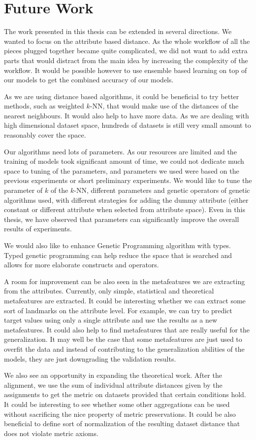 \section{Future Work}
The work presented in this thesis can be extended in several directions. We wanted to focus on the attribute based distance. As the whole workflow of all the pieces plugged together became quite complicated, we did not want to add extra parts that would distract from the main idea by increasing the complexity of the workflow. It would be possible however to use ensemble based learning on top of our models to get the combined accuracy of our models. 

As we are using distance based algorithms, it could be beneficial to try better methods, such as weighted $k$-NN, that would make use of the distances of the nearest neighbours. It would also help to have more data. As we are dealing with high dimensional dataset space, hundreds of datasets is still very small amount to reasonably cover the space. 

Our algorithms need lots of parameters. As our resources are limited and the training of models took significant amount of time, we could not dedicate much space to tuning of the parameters, and parameters we used were based on the previous experiments or short preliminary experiments. We would like to tune the parameter of $k$ of the $k$-NN, different parameters and genetic operators of genetic algorithms used, with different strategies for adding the dummy attribute (either constant or different attribute when selected from attribute space). Even in this thesis, we have observed that parameters can significantly improve the overall results of experiments.

We would also like to enhance Genetic Programming algorithm with types. Typed genetic programming \cite{typedGp,tomCec14} can help reduce the space that is searched and allows for more elaborate constructs and operators.

A room for improvement can be also seen in the metafeatures we are extracting from the attributes. Currently, only simple, statistical and theoretical metafeatures are extracted. It could be interesting whether we can extract some sort of landmarks on the attribute level. For example, we can try to predict target values using only a single attribute and use the results as a new metafeatures. It could also help to find metafeatures that are really useful for the generalization. It may well be the case that some metafeatures are just used to overfit the data and instead of contributing to the generalization abilities of the models, they are just downgrading the validation results.

We also see an opportunity in expanding the theoretical work. After the alignment, we use the sum of individual attribute distances given by the assignments to get the metric on datasets provided that certain conditions hold. It could be interesting to see whether some other aggregations can be used without sacrificing the nice property of metric preservations. It could be also beneficial to define sort of normalization of the resulting dataset distance that does not violate metric axioms.